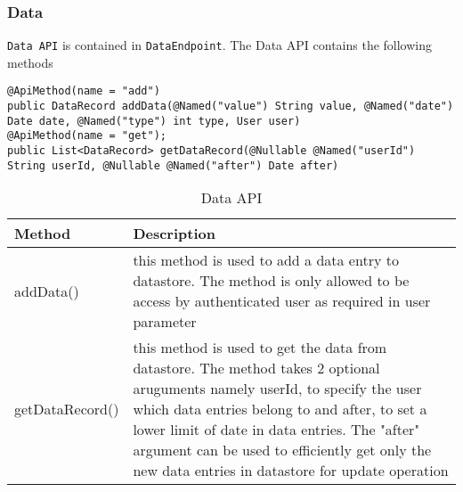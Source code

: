 \subsubsection{Data}
\texttt{Data API} is contained in \texttt{DataEndpoint}. The Data API contains the following methods \\
\begin{minipage}{\linewidth}
\begin{lstlisting}
@ApiMethod(name = "add")
public DataRecord addData(@Named("value") String value, @Named("date") Date date, @Named("type") int type, User user)
@ApiMethod(name = "get");
public List<DataRecord> getDataRecord(@Nullable @Named("userId") String userId, @Nullable @Named("after") Date after)
\end{lstlisting}
\end{minipage}

\begin{table}
\begin{center}
    \begin{tabularx}{\textwidth}{|l|X|}
        \hline Method & Description \\
        \hline addData() & 
            this method is used to add a data entry to datastore. The method is only allowed to be access by
            authenticated user as required in user parameter \\
        \hline getDataRecord() &
            this method is used to get the data from datastore. The method takes 2 optional aruguments namely userId, to
            specify the user which data entries belong to and after, to set a lower limit of date in data entries. The
            "after" argument can be used to efficiently get only the new data entries in datastore for update operation
            \\
        \hline
    \end{tabularx}
\end{center}
\caption{Data API}
\end{table}

